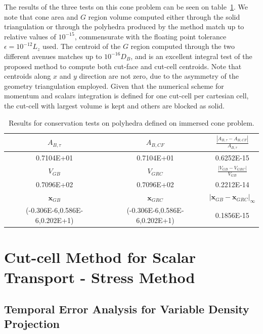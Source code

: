 \documentclass[11pt]{book}
\begin{document}
The results of the three tests on this cone problem can be seen on table~\ref{tab:cone_res}. We note that cone area and $G$ region volume computed either through the solid triangulation or through the polyhedra produced by the method match up to relative values of $10^{-15}$, commensurate with the floating point tolerance $\epsilon=10^{-12}L_z$ used. The centroid of the $G$ region computed through the two different avenues matches up to $10^{-16}D_B$, and is an excellent integral test of the proposed method to compute both cut-face and cut-cell centroids. Note that centroids along $x$ and $y$ direction are not zero, due to the asymmetry of the geometry triangulation employed. Given that the numerical scheme for momentum and scalars integration is defined for one cut-cell per cartesian cell, the cut-cell with largest volume is kept and others are blocked as solid.
%
\begin{table}[h]
  \centering
  \begin{tabular}[\textwidth]{c|c|c}
    \hline \hline
      $A_{B,\tau}$ & $A_{B,CF}$ & $\frac{|A_{B,\tau}-A_{B,CF} |}{A_{B,\tau}}$ \\ \hline
       {0.7104E+01} & {0.7104E+01} & {0.6252E-15} \\
    \hline \hline
      $V_{GB}$ & $V_{GRC}$ & $\frac{|V_{GB}-V_{GRC}|}{V_{GB}}$ \\  \hline
      {0.7096E+02} & {0.7096E+02} & {0.2212E-14} \\
    \hline \hline
    $\mathbf{x}_{GB}$ & $\mathbf{x}_{GRC}$ & $|\mathbf{x}_{GB}-\mathbf{x}_{GRC}|_\infty$ \\
    \hline \hline
    {(-0.306E-6,0.586E-6,0.202E+1)} &
    {(-0.306E-6,0.586E-6,0.202E+1)} &
    {0.1856E-15} \\
    \hline
  \end{tabular}
  \caption[Conservation tests for polyhedra]{Results for conservation tests on polyhedra defined on immersed cone problem.}
  \label{tab:cone_res}
\end{table}
%


\section{Cut-cell Method for Scalar Transport - Stress Method}

\subsection{Temporal Error Analysis for Variable Density Projection}
\end{document}
